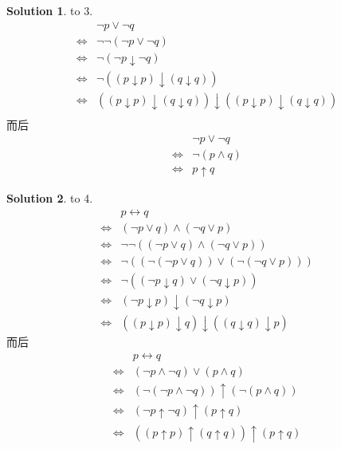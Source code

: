 \documentclass[12pt, a4paper]{ctexart} %
\theoremstyle{plain}
\theoremstyle{definition}
\newtheorem*{solution}{Solution}
\def\downa{\downarrow}
\def\upa{\uparrow}
\def\lra{\Leftrightarrow}
\begin{document}
\begin{solution} to 3.
        \begin{align*}
            & \neg p \lor \neg q\\
            \lra & \neg \neg \left( \neg p \lor \neg q\right) \\
            \lra & \neg \left( \neg p \downa \neg q\right) \\
            \lra & \neg \left( \left( p \downa p\right) \downa \left( q \downa q\right) \right)\\
            \lra & \left( \left( p \downa p \right) \downa \left(q \downa q\right) \right) \downa \left( \left( p \downa p \right) \downa \left(q \downa q\right) \right) \\
        \end{align*}
        而后 
        \begin{align*}
            & \neg p \lor \neg q \\
            \lra & \neg \left( p \wedge q\right) \\
            \lra & p \upa q 
        \end{align*}
\end{solution}
\begin{solution} to 4. 
        \begin{align*}
            & p \leftrightarrow q \\
            \lra & \left(\neg p \lor q\right) \wedge \left( \neg q \vee p\right)\\
            \lra & \neg \neg \left(  \left( \neg p \vee q\right) \wedge \left( \neg q \vee p\right) \right) \\
            \lra & \neg \left( \left( \neg \left( \neg p \vee q\right)\right) \vee \left( \neg \left( \neg q \vee p\right)\right)\right) \tag{de Morgan's law}\\ 
            \lra & \neg \left( \left( \neg p \downa q\right) \vee \left( \neg q \downa p\right)\right)\\
            \lra & \left(\neg p \downa p\right) \downa \left(\neg q \downa p\right)\\
            \lra & \left(\left( p \downa p \right) \downa q  \right) \downa \left( \left( q\downa q\right) \downa p\right)
        \end{align*}
        而后
        \begin{align*}
            & p \leftrightarrow q \\
            \lra & \left(\neg p \wedge  \neg q \right) \vee \left( p \wedge q\right)  \tag{经过简单的化简}\\
            \lra & \left( \neg \left(\neg p \wedge \neg q\right)\right) \upa \left(\neg \left( p \wedge q\right)\right) \\
            \lra & \left( \neg p \upa \neg q\right) \upa \left( p \upa q\right) \\
            \lra & \left(\left( p \upa p \right) \upa \left( q \upa q\right)\right) \upa \left( p \upa q\right)
        \end{align*}
\end{solution}
\end{document}
